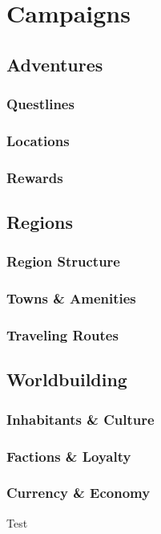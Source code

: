 

\part{Campaigns}

\chapter{Adventures}
\section{Questlines}
\section{Locations}
\section{Rewards}

\chapter{Regions}
\section{Region Structure}
\section{Towns \& Amenities}
\section{Traveling Routes}

\chapter{Worldbuilding}
\section{Inhabitants \& Culture}
\section{Factions \& Loyalty}
\section{Currency \& Economy}
Test

